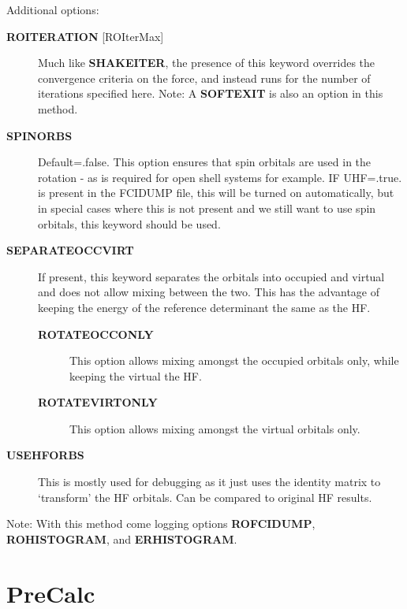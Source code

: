 \documentclass[openany,a4paper,10pt,english]{manual}
\begin{document}
Additional options:
\begin{description}
\item[\textbf{ROITERATION} {[}ROIterMax{]}] \leavevmode
Much like \textbf{SHAKEITER}, the presence of this keyword overrides the convergence criteria
on the force, and instead runs for the number of iterations specified here.
Note: A \textbf{SOFTEXIT} is also an option in this method.

\item[\textbf{SPINORBS}] \leavevmode
Default=.false.
This option ensures that spin orbitals are used in the rotation - as is required for open shell
systems for example.
IF UHF=.true. is present in the FCIDUMP file, this will be turned on automatically, but in special
cases where this is not present and we still want to use spin orbitals, this keyword should be used.

\item[\textbf{SEPARATEOCCVIRT}] \leavevmode
If present, this keyword separates the orbitals into occupied and virtual and does not
allow mixing between the two.
This has the advantage of keeping the energy of the reference determinant the same as the HF.
\begin{description}
\item[\textbf{ROTATEOCCONLY}] \leavevmode
This option allows mixing amongst the occupied orbitals only, while keeping the virtual
the HF.

\item[\textbf{ROTATEVIRTONLY}] \leavevmode
This option allows mixing amongst the virtual orbitals only.

\end{description}

\item[\textbf{USEHFORBS}] \leavevmode
This is mostly used for debugging as it just uses the identity matrix to `transform' the HF orbitals.
Can be compared to original HF results.

\end{description}

Note: With this method come logging options \textbf{ROFCIDUMP}, \textbf{ROHISTOGRAM}, and \textbf{ERHISTOGRAM}.

\resetcurrentobjects
\hypertarget{--doc-input/precalc}{}

\hypertarget{input-precalc}{}\section{PreCalc}
\end{document}

